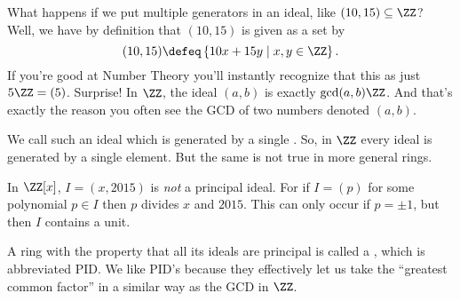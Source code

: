 What happens if we put multiple generators in an ideal, like $(10,15) \subseteq \ZZ$?
Well, we have by definition that $(10,15)$ is given as a set by
\[ 
	(10,15) \defeq \left\{ 10x + 15y \mid x,y \in \ZZ \right\}.
\]
If you're good at Number Theory you'll instantly recognize that this as just $5\ZZ = (5)$.
Surprise! In $\ZZ$, the ideal $(a,b)$ is exactly $\gcd(a,b) \ZZ$.
And that's exactly the reason you often see the GCD of two numbers denoted $(a,b)$.

We call such an ideal which is generated by a single .
So, in $\ZZ$ every ideal is generated by a single element.
But the same is not true in more general rings.
\begin{example}
	In $\ZZ[x]$, $I = (x,2015)$ is \emph{not} a principal ideal.
	For if $I = (p)$ for some polynomial $p \in I$
	then $p$ divides $x$ and $2015$.
	This can only occur if $p = \pm 1$,
	but then $I$ contains a unit.
\end{example}
A ring with the property that all its ideals are principal is called a ,
which is abbreviated PID.
We like PID's because they effectively let us take the ``greatest common factor''
in a similar way as the GCD in $\ZZ$.

